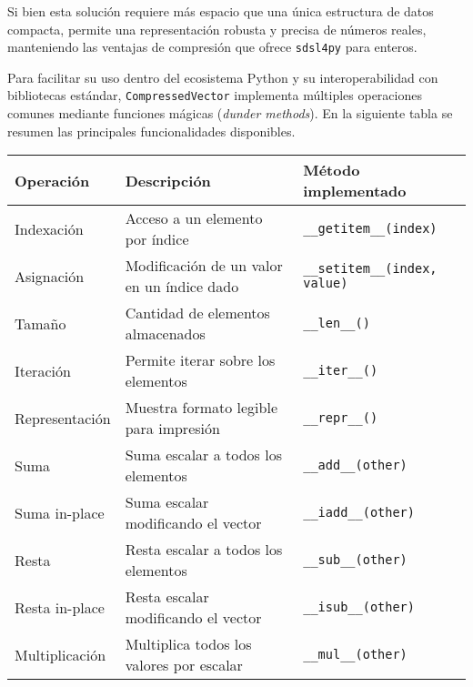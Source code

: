 \vspace{1em}
\noindent
Si bien esta solución requiere más espacio que una única estructura de datos compacta, permite una representación robusta y precisa de números reales, manteniendo las ventajas de compresión que ofrece \texttt{sdsl4py} para enteros.

Para facilitar su uso dentro del ecosistema Python y su interoperabilidad con bibliotecas estándar, \texttt{CompressedVector} implementa múltiples operaciones comunes mediante funciones mágicas (\textit{dunder methods}). En la siguiente tabla se resumen las principales funcionalidades disponibles.

\begin{table}[H]
\centering
\renewcommand{\arraystretch}{1.3} %
\begin{tabular}{|p{3.5cm}|p{6cm}|p{5cm}|}
\hline
\textbf{Operación} & \textbf{Descripción} & \textbf{Método implementado} \\
\hline
\rule{0pt}{1.5em}Indexación         & Acceso a un elemento por índice                & \texttt{\_\_getitem\_\_(index)} \\
\hline
\rule{0pt}{1.5em}Asignación         & Modificación de un valor en un índice dado     & \texttt{\_\_setitem\_\_(index, value)} \\
\hline
\rule{0pt}{1.5em}Tamaño             & Cantidad de elementos almacenados              & \texttt{\_\_len\_\_()} \\
\hline
\rule{0pt}{1.5em}Iteración          & Permite iterar sobre los elementos             & \texttt{\_\_iter\_\_()} \\
\hline
\rule{0pt}{1.5em}Representación     & Muestra formato legible para impresión         & \texttt{\_\_repr\_\_()} \\
\hline
\rule{0pt}{1.5em}Suma               & Suma escalar a todos los elementos             & \texttt{\_\_add\_\_(other)} \\
\hline
\rule{0pt}{1.5em}Suma in-place      & Suma escalar modificando el vector             & \texttt{\_\_iadd\_\_(other)} \\
\hline
\rule{0pt}{1.5em}Resta              & Resta escalar a todos los elementos            & \texttt{\_\_sub\_\_(other)} \\
\hline
\rule{0pt}{1.5em}Resta in-place     & Resta escalar modificando el vector            & \texttt{\_\_isub\_\_(other)} \\
\hline
\rule{0pt}{1.5em}Multiplicación     & Multiplica todos los valores por escalar       & \texttt{\_\_mul\_\_(other)} \\

\end{tabular}
\end{table}
